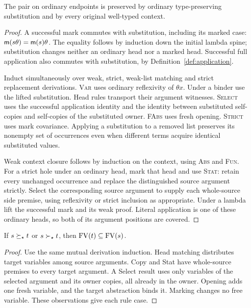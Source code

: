 \begin{lemma}\label{lem:structural-stability}
The pair on ordinary endpoints is preserved by ordinary type-preserving
substitution and by every original well-typed context.
\end{lemma}
\begin{proof}
A successful mark commutes with substitution, including its marked case:
$\mathsf m(s\theta)=\mathsf m(s)\theta$. The equality follows by induction down
the initial lambda spine; substitution changes neither an ordinary head
nor a marked head. Successful full application also commutes with
substitution, by Definition~\ref{def:application}.

Induct simultaneously over weak, strict, weak-list matching and strict
replacement derivations. \textsc{Var} uses ordinary reflexivity of
$\theta x$. Under a binder use the lifted substitution. Head rules
transport their argument witnesses. \textsc{Select} uses the successful
application identity and the identity between substituted self-copies
and self-copies of the substituted owner. \textsc{FAbs} uses fresh
opening. \textsc{Strict} uses mark covariance. Applying a substitution
to a removed list preserves its nonempty set of occurrences even when
different terms acquire identical substituted values.

Weak context closure follows by induction on the context, using
\textsc{Abs} and \textsc{Fun}. For a strict hole under an ordinary head,
mark that head and use \textsc{Stat}: retain every unchanged occurrence
and replace the distinguished source argument strictly. Select the
corresponding source argument to supply each whole-source side premise,
using reflexivity or strict inclusion as appropriate. Under a lambda
lift the successful mark and its weak proof. Literal application is
one of these ordinary heads, so both of its argument positions are covered.
\end{proof}

\begin{lemma}\label{lem:fv}
If $s\succeq_\star t$ or $s\succ_\star t$, then $\operatorname{FV}(t)\subseteq\operatorname{FV}(s)$.
\end{lemma}
\begin{proof}
Use the same mutual derivation induction. Head matching distributes target
variables among source arguments. Copy and Stat have whole-source premises
to every target argument. A Select result uses only variables of the
selected argument and its owner copies, all already in the owner.
Opening adds one fresh variable, and the target abstraction binds it.
Marking changes no free variable. These observations give each rule case.
\end{proof}

